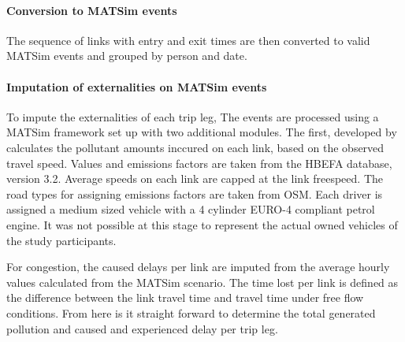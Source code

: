 \paragraph{Conversion to MATSim events} 
The sequence of links with entry and exit times are then converted to valid MATSim events and grouped by person and date.

\paragraph{Imputation of externalities on MATSim events}
To impute the externalities of each trip leg, The events are processed using a MATSim framework set up with two additional modules. The first, developed by \citet{kaddoura2017simulation} calculates the pollutant amounts inccured on each link, based on the observed travel speed. Values and emissions factors are taken from the HBEFA database, version 3.2. Average speeds on each link are capped at the link freespeed. The road types for assigning emissions factors are taken from OSM. Each driver is assigned a medium sized vehicle with a 4 cylinder EURO-4 compliant petrol engine. It was not possible at this stage to represent the actual owned vehicles of the study participants.

For congestion, the caused delays per link are imputed from the average hourly values calculated from the MATSim scenario. The time lost per link is defined as the difference between the link travel time and travel time under free flow conditions. From here is it straight forward to determine the total generated pollution and caused and experienced delay per trip leg.
